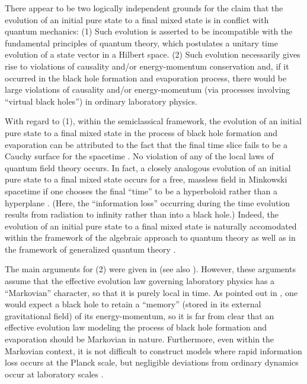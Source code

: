 There appear to be two logically independent grounds for the claim
that the evolution of an initial pure state to a final mixed state is
in conflict with quantum mechanics: (1) Such evolution is asserted to
be incompatible with the fundamental principles of quantum theory,
which postulates a unitary time evolution of a state vector in a
Hilbert space. (2) Such evolution necessarily gives rise to violations
of causality and/or energy-momentum conservation and, if it occurred
in the black hole formation and evaporation process, there would be
large violations of causality and/or energy-momentum (via processes
involving ``virtual black holes'') in ordinary laboratory physics.

With regard to (1), within the semiclassical framework, the evolution
of an initial pure state to a final mixed state in the process of
black hole formation and evaporation can be attributed to the fact
that the final time slice fails to be a Cauchy surface for the
spacetime \cite{w4}. No violation of any of the local laws of quantum
field theory occurs. In fact, a closely analogous evolution of an
initial pure state to a final mixed state occurs for a free, massless
field in Minkowski spacetime if one chooses the final ``time'' to be a
hyperboloid rather than a hyperplane \cite{w4}. (Here, the
``information loss'' occurring during the time evolution results from
radiation to infinity rather than into a black hole.) Indeed, the
evolution of an initial pure state to a final mixed state is naturally
accomodated within the framework of the algebraic approach to quantum
theory \cite{w4} as well as in the framework of generalized quantum
theory \cite{ha}.

The main arguments for (2) were given in \cite{bps} (see also
\cite{ehns}). However, these arguments assume that the effective
evolution law governing laboratory physics has a ``Markovian''
character, so that it is purely local in time. As pointed out in
\cite{uw3}, one would expect a black hole to retain a ``memory''
(stored in its external gravitational field) of its energy-momentum,
so it is far from clear that an effective evolution law modeling the
process of black hole formation and evaporation should be Markovian in
nature. Furthermore, even within the Markovian context, it is not
difficult to construct models where rapid information loss occurs at
the Planck scale, but negligible deviations from ordinary dynamics
occur at laboratory scales \cite{uw3}.

